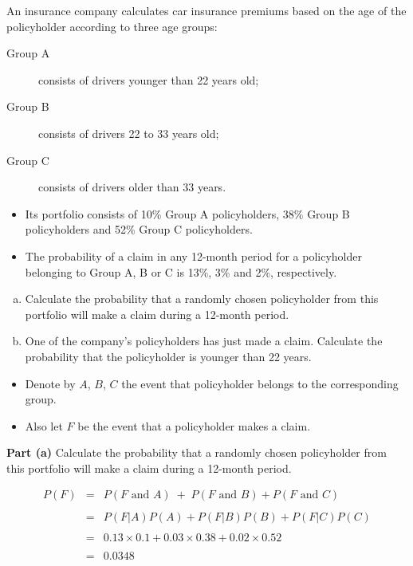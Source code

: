 \documentclass[a4paper,12pt]{article}
\begin{document}
	\large 
	\noindent An insurance company calculates car insurance premiums based on the age of the policyholder according to three age groups:
	\begin{description}
	\item[Group A] consists of drivers younger than 22 years old; 
	\item[Group B] consists of drivers 22 to 33 years old;
	\item[Group C] consists of
	drivers older than 33 years.
\end{description}
\medskip
	\begin{itemize}
		\item Its portfolio consists of 10\% Group A policyholders, 38\% Group B policyholders and 52\% Group C policyholders.
		\item 
		The probability of a claim in any 12-month period for a policyholder belonging to Group A, B or C is 13\%, 3\% and 2\%, respectively.
	\end{itemize}
	
	\begin{enumerate}[(a)]
		\item %
		Calculate the probability that a randomly chosen policyholder from this
		portfolio will make a claim during a 12-month period.
		
		
		\item %
		One of the company’s policyholders has just made a claim. Calculate the probability that the policyholder is younger than 22 years.
	\end{enumerate}
	\newpage \begin{itemize}
		\item Denote by $A$, $B$, $C$ the event that policyholder belongs to the corresponding group.
		\item Also let $F$ be the event that a policyholder makes a claim.
	\end{itemize}
	\medskip
	
	\noindent \textbf{Part (a) } 
	\noindent Calculate the probability that a randomly chosen policyholder from this
	portfolio will make a claim during a 12-month period.
	
	
	
	
	\begin{eqnarray*}
		P(F) &=& P( F \mbox{ and } A) \;+\; P( F \mbox{ and } B) + P( F \mbox{ and } C) \\
		& & \\
		&=& P(F|A)P(A) + P(F|B)P(B) + P(F|C)P(C)\\
		& & \\
		&=& 0.13\times 0.1 + 0.03\times 0.38 + 0.02\times 0.52 \\
		& & \\
		&=& 0.0348\\
	\end{eqnarray*}
	\newpage
	
\end{document}
